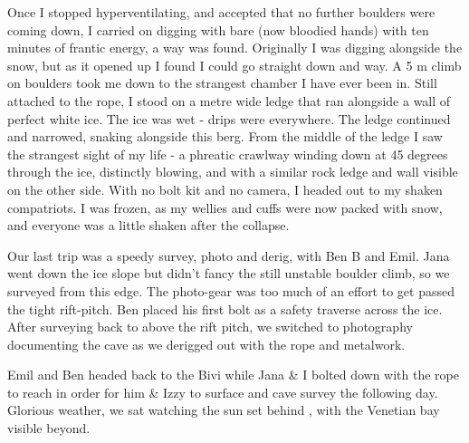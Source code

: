 Once I stopped hyperventilating, and accepted that no further boulders
were coming down, I carried on digging with bare (now bloodied hands)
with ten minutes of frantic energy, a way was found. Originally I was
digging alongside the snow, but as it opened up I found I could go
straight down and way. A 5 m climb on boulders took me down to the
strangest chamber I have ever been in. Still attached to the rope, I
stood on a metre wide ledge that ran alongside a wall of perfect white
ice. The ice was wet - drips were everywhere. The ledge continued and
narrowed, snaking alongside this berg. From the middle of the ledge I
saw the strangest sight of my life - a phreatic crawlway winding down at
45 degrees through the ice, distinctly blowing, and with a similar rock
ledge and wall visible on the other side. With no bolt kit and no
camera, I headed out to my shaken compatriots. I was frozen, as my
wellies and cuffs were now packed with snow, and everyone was a little
shaken after the collapse.


Our last trip was a speedy survey, photo and derig, with Ben B and Emil.
Jana went down the ice slope but didn't fancy the still unstable boulder
climb, so we surveyed from this edge. The photo-gear was too much of an
effort to get passed the tight rift-pitch. Ben placed his first bolt as
a safety traverse across the ice. After surveying back to above the rift
pitch, we switched to photography documenting the cave as we derigged
out with the rope and metalwork.

Emil and Ben headed back to the Bivi while Jana \& I bolted down with
the  rope to reach  in order for him \& Izzy to surface and cave survey the following day. Glorious weather, we sat watching the sun set behind , with the Venetian bay visible beyond.


